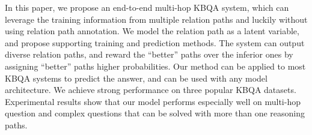 
In this paper, we propose an end-to-end multi-hop KBQA system, which can leverage the training information from multiple relation paths and luckily without using relation path annotation. We model the relation path as a latent variable, and propose supporting training and prediction methods. The system can output diverse relation paths, and reward the ``better'' paths over the inferior ones by assigning ``better'' paths higher probabilities. Our method can be applied to most KBQA systems to predict the answer, and can be used with any model architecture. We achieve strong performance on three popular KBQA datasets. Experimental results show that our model performs especially well on multi-hop question and complex questions that can be solved with more than one reasoning paths.

